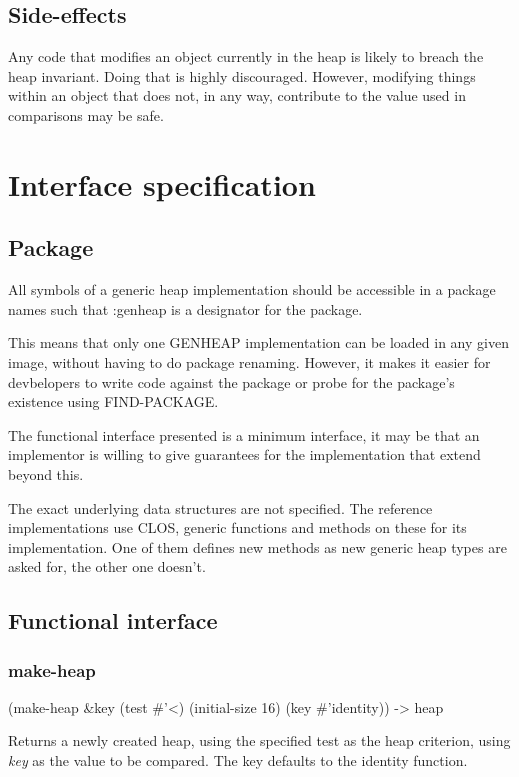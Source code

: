 \documentclass{report}
\begin{document}
\subsection{Side-effects}

Any code that modifies an object currently in the heap is likely to
breach the heap invariant. Doing that is highly discouraged. However,
modifying things within an object that does not, in any way,
contribute to the value used in comparisons may be safe.
 
\section{Interface specification}
 \subsection{Package}
 All symbols of a generic heap implementation should be accessible in
 a package names such that :genheap is a designator for the
 package.

 This means that only one GENHEAP implementation can be loaded in any
 given image, without having to do package renaming. However, it makes
 it easier for devbelopers to write code against the package or probe
 for the package's existence using FIND-PACKAGE.

 The functional interface presented is a minimum interface, it may be
 that an implementor is willing to give guarantees for the
 implementation that extend beyond this.

 The exact underlying data structures are not specified. The reference
 implementations use CLOS, generic functions and methods on these for
 its implementation. One of them defines new methods as new generic
 heap types are asked for, the other one doesn't.

 \subsection{Functional interface}
 \subsubsection{make-heap}
   (make-heap \&key (test \#'<) (initial-size 16) (key \#'identity)) -> heap

 Returns a newly created heap, using the specified test as the heap
 criterion, using {\sl key} as the value to be compared. The key
 defaults to the identity function.
\end{document}
